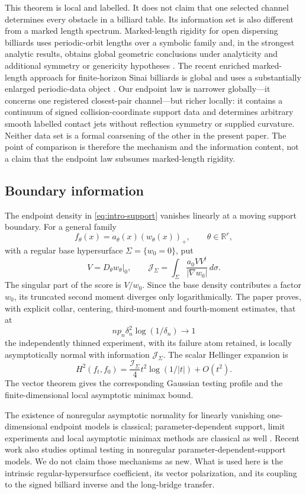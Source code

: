 This theorem is local and labelled.  It does not claim that one selected
channel determines every obstacle in a billiard table.  Its information set is
also different from a marked length spectrum.  Marked-length rigidity for
open dispersing billiards uses periodic-orbit lengths over a symbolic family
and, in the strongest analytic results, obtains global geometric conclusions
under analyticity and additional symmetry or genericity hypotheses
\cite{BDKL,DSKL,Osterman}.  The recent enriched marked-length approach for
finite-horizon Sinai billiards is global and uses a substantially enlarged
periodic-data object \cite{FinamoreLeguil}.  Our endpoint law is narrower
globally---it concerns one registered closest-pair channel---but richer
locally: it contains a continuum of signed collision-coordinate support data
and determines arbitrary smooth labelled contact jets without reflection
symmetry or supplied curvature.  Neither data set is a formal coarsening of
the other in the present paper.  The point of comparison is therefore the
mechanism and the information content, not a claim that the endpoint law
subsumes marked-length rigidity.

\subsection{Boundary information}

The endpoint density in \eqref{eq:intro-support} vanishes linearly at a moving
support boundary.  For a general family
\[
 f_\theta(x)=a_\theta(x)(w_\theta(x))_+,
 \qquad \theta\in\mathbb R^r,
\]
with a regular base hypersurface $\Sigma=\{w_0=0\}$, put
\[
 V=D_\theta w_\theta|_0,
 \qquad
 \mathcal J_\Sigma
 =\int_\Sigma\frac{a_0VV^t}{|\nabla w_0|}\,d\sigma.
\]
The singular part of the score is $V/w_0$.  Since the base density contributes
a factor $w_0$, its truncated second moment diverges only logarithmically.
The paper proves, with explicit collar, centering, third-moment and
fourth-moment estimates, that at
\[
 np_n\delta_n^2\log(1/\delta_n)\longrightarrow1
\]
the independently thinned experiment, with its failure atom retained, is
locally asymptotically normal with information $\mathcal J_\Sigma$.  The
scalar Hellinger expansion is
\[
 H^2(f_t,f_0)=\frac{\mathcal I_\Sigma}{4}
 t^2\log(1/|t|)+O(t^2).
\]
The vector theorem gives the corresponding Gaussian testing profile and the
finite-dimensional local asymptotic minimax bound.

The existence of nonregular asymptotic normality for linearly vanishing
one-dimensional endpoint models is classical; parameter-dependent support,
limit experiments and local asymptotic minimax methods are classical as well
\cite{Smith1985,IbragimovHasminskii,HiranoPorter}.  Recent work also studies
optimal testing in nonregular parameter-dependent-support models.  We do not
claim those mechanisms as new.  What is used here is the intrinsic
regular-hypersurface coefficient, its vector polarization, and its coupling
to the signed billiard inverse and the long-bridge transfer.

